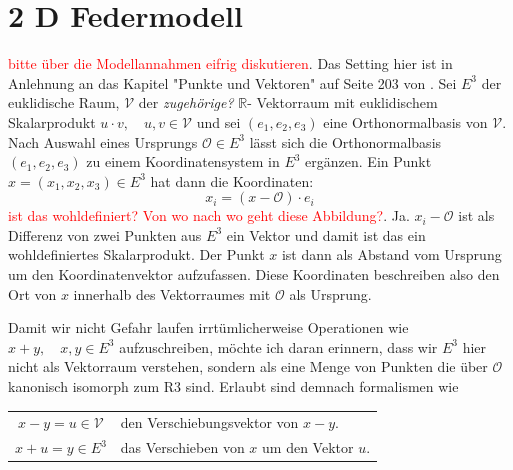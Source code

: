 \section{2 D Federmodell}
\textcolor{red}{bitte über die Modellannahmen eifrig diskutieren}. Das Setting hier ist in Anlehnung an das Kapitel "Punkte und Vektoren" auf Seite 203 von \cite{EckGarcke2017}. Sei $E^3$ der euklidische Raum, $\mathcal{V}$ der \textit{zugehörige?} $\mathbb{R}$- Vektorraum mit euklidischem Skalarprodukt $u \cdot v, \quad u,v \in \mathcal{V}$ und sei $(e_1, e_2, e_3)$ eine Orthonormalbasis von $\mathcal{V}$. \newline 
Nach Auswahl eines Ursprungs $\mathcal{O} \in E^3$ lässt sich die Orthonormalbasis $(e_1, e_2, e_3)$ zu einem Koordinatensystem in $E^3$ ergänzen. Ein Punkt $x=(x_1, x_2, x_3) \in E^3$ hat dann die Koordinaten:
\begin{equation*}
	x_i = (x-\mathcal{O}) \cdot e_i
\end{equation*}
\textcolor{red}{ist das wohldefiniert? Von wo nach wo geht diese Abbildung?}. Ja. $x_i - \mathcal{O}$ ist als Differenz von zwei Punkten aus $E^3$ ein Vektor und damit ist das ein wohldefiniertes Skalarprodukt. Der Punkt $x$ ist dann als Abstand vom Ursprung um den Koordinatenvektor aufzufassen. Diese Koordinaten beschreiben also den Ort von $x$ innerhalb des Vektorraumes mit $\mathcal{O}$ als Ursprung. \newline 

Damit wir nicht Gefahr laufen irrtümlicherweise Operationen wie $x+y, \quad x,y \in E^3$ aufzuschreiben, möchte ich daran erinnern, dass wir $E^3$ hier nicht als Vektorraum verstehen, sondern als eine Menge von Punkten die über $\mathcal{O}$ kanonisch isomorph zum R3 sind. Erlaubt sind demnach formalismen wie
			\begin{tabularx}{\textwidth}{@{}cX@{}}
				$ x-y=u \in \mathcal{V}$ & den Verschiebungsvektor von $x-y$. \\
				$ x+u=y \in E^3$ & das Verschieben von $x$ um den Vektor $u$. \\
			\end{tabularx}
	




